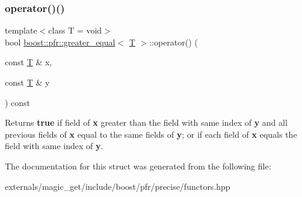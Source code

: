 \subsubsection{\texorpdfstring{operator()()}{operator()()}}
{\footnotesize\ttfamily template$<$class T  = void$>$ \\
bool \mbox{\hyperlink{structboost_1_1pfr_1_1greater__equal}{boost\+::pfr\+::greater\+\_\+equal}}$<$ \mbox{\hyperlink{struct_t}{T}} $>$\+::operator() (\begin{DoxyParamCaption}\item[{const \mbox{\hyperlink{struct_t}{T}} \&}]{x,  }\item[{const \mbox{\hyperlink{struct_t}{T}} \&}]{y }\end{DoxyParamCaption}) const\hspace{0.3cm}{\ttfamily [inline]}}

\begin{DoxyReturn}{Returns}
{\bfseries true} if field of {\bfseries x} greater than the field with same index of {\bfseries y} and all previous fields of {\bfseries x} equal to the same fields of {\bfseries y}; or if each field of {\bfseries x} equals the field with same index of {\bfseries y}.
\end{DoxyReturn}


The documentation for this struct was generated from the following file\+:\begin{DoxyCompactItemize}
\item 
externals/magic\+\_\+get/include/boost/pfr/precise/functors.\+hpp\end{DoxyCompactItemize}
